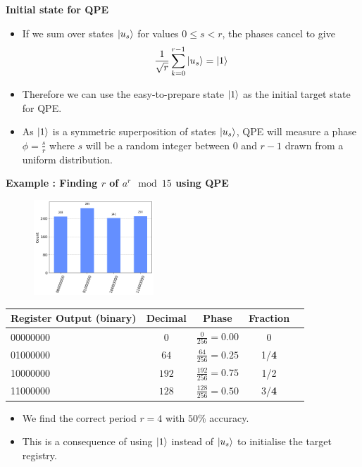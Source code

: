 \documentclass[english]{beamer}
\begin{document}
\begin{frame}{\textbf{Initial state for QPE}}

\begin{itemize}

\item If we sum over states $\ket{u_s}$ for values $0 \le s < r$, the phases cancel to give
\begin{equation}
        \frac{1}{\sqrt{r}} \sum_{k=0}^{r-1} \ket{u_s}
        	=
	\ket{1}
\end{equation}
\item Therefore we can use the easy-to-prepare state $\ket{1}$ as the initial target state for QPE. 
\item As $\ket{1}$ is a symmetric superposition of states $\ket{u_s}$, QPE will measure a phase $\phi = \frac{s}{r}$ where $s$ will be a random integer between 0 and $r-1$ drawn from a uniform distribution.
\end{itemize}


\end{frame}

\begin{frame}{\textbf{Example : Finding $r$ of $a^r \mod 15$ using QPE}}
	
\begin{figure}
	\includegraphics[width=0.4\textwidth]{figs/output}
\end{figure}
\begin{tabular}{|l|c|c|c|c|}
\hline
Register Output (binary) & Decimal & Phase & Fraction \\
\hline
00000000 & $0$ & $\frac{0}{256} = 0.00$ & 0\\
01000000 & $64$ & $\frac{64}{256} = 0.25$ &1/\textbf{4}\\
10000000 & $192$ & $\frac{192}{256} = 0.75$ & 1/2\\
11000000 & $128$ & $\frac{128}{256} = 0.50$ & 3/\textbf{4}\\
\hline
\end{tabular}

\begin{itemize}
\item We find the correct period $r=4$ with $50\%$ accuracy.
\item This is a consequence of using $\ket{1}$ instead of $\ket{u_s}$ to initialise the target registry.
\end{itemize}

\end{frame}
\end{document}
